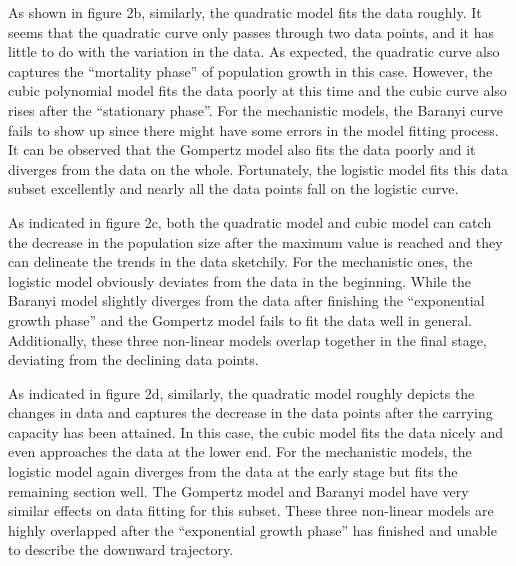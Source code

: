\documentclass[11pt, a4paper]{article}
\begin{document}
As shown in figure 2b, similarly, the quadratic model fits the data roughly. It seems that the quadratic curve only passes through two data points, and it has little to do with the variation in the data. As expected, the quadratic curve also captures the “mortality phase” of population growth in this case. However, the cubic polynomial model fits the data poorly at this time and the cubic curve also rises after the “stationary phase”. For the mechanistic models, the Baranyi curve fails to show up since there might have some errors in the model fitting process. It can be observed that the Gompertz model also fits the data poorly and it diverges from the data on the whole. Fortunately, the logistic model fits this data subset excellently and nearly all the data points fall on the logistic curve. 

As indicated in figure 2c, both the quadratic model and cubic model can catch the decrease in the population size after the maximum value is reached and they can delineate the trends in the data sketchily. For the mechanistic ones, the logistic model obviously deviates from the data in the beginning. While the Baranyi model slightly diverges from the data after finishing the “exponential growth phase” and the Gompertz model fails to fit the data well in general. Additionally, these three non-linear models overlap together in the final stage, deviating from the declining data points.  

As indicated in figure 2d, similarly, the quadratic model roughly depicts the changes in data and captures the decrease in the data points after the carrying capacity has been attained. In this case, the cubic model fits the data nicely and even approaches the data at the lower end. For the mechanistic models, the logistic model again diverges from the data at the early stage but fits the remaining section well. The Gompertz model and Baranyi model have very similar effects on data fitting for this subset. These three non-linear models are highly overlapped after the “exponential growth phase” has finished and unable to describe the downward trajectory. 
\end{document}
